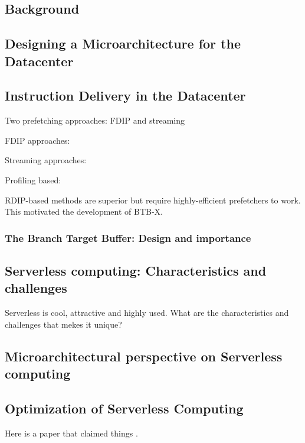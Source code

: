 \documentclass[../main.tex]{subfiles}
\begin{document}
\ifx\chapincluded\undefined
  \begin{refsection}
 \fi


\chapter{Background}

\section{Designing a Microarchitecture for the Datacenter}
\cite{kanev15_profil,ferdman_12_clear_cloud}


\section{Instruction Delivery in the Datacenter}


Two prefetching approaches: FDIP and streaming


FDIP approaches: \cite{reinman99_fetch_direc_instr_prefet, kumar17_boomer,kumar18_blast_throug_front_end_bottl_with_shotg,kumar20_shoot_down_server_front_end_bottl}

Streaming approaches:
\cite{ferdman11_proac_instr_fetch,kaynak13_shift,kaynak15_confl}

Profiling based:


RDIP-based methods are superior but require highly-efficient prefetchers to work. This motivated the development of BTB-X.

\subsection{The Branch Target Buffer: Design and importance}




\section{Serverless computing: Characteristics and challenges}
Serverless is cool, attractive and highly used. What are the characteristics and challenges that mekes it unique?

\section{Microarchitectural perspective on Serverless computing}

\section{Optimization of Serverless Computing}


Here is a paper that claimed things \cite{kanev15_profil}.



\ifx\chapincluded\undefined
  \printbibliography
  \end{refsection}
 \fi
\end{document}
